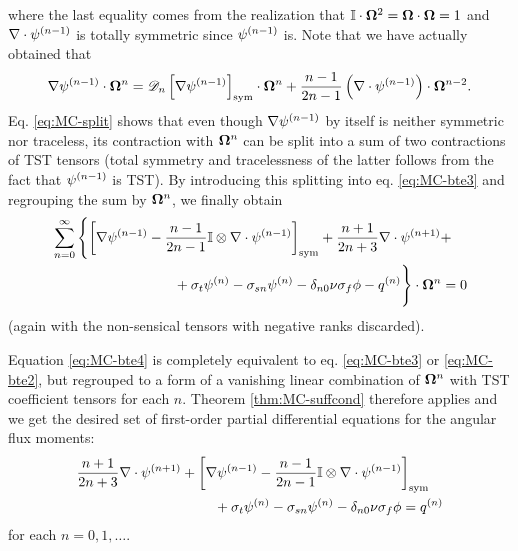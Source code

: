 where the last equality comes from the realization that $\eye\cdot\bomega^2 = \bomega\cdot\bomega = 1$ and 
$\nabla\cdot\fmom[n-1]$ is totally symmetric since $\fmom[n-1]$ is. 
Note that we have actually obtained that
\begin{equation}\label{eq:MC-split}
  \nabla\fmom[n-1]\contr\bomega^n = \detr\Sym{\nabla\fmom[n-1]}\contr\bomega^n + 
  \frac{n-1}{2n-1}\left(\nabla\cdot\fmom[n-1]\right)\contr\bomega^{n-2}.
\end{equation}
Eq. \eqref{eq:MC-split} shows that even though $\nabla\fmom[n-1]$ by itself is neither symmetric nor traceless, its 
contraction with $\bomega^n$ can be split into a sum of two contractions of TST tensors (total symmetry and 
tracelessness of the latter follows from the fact that $\fmom[n-1]$ is TST). By introducing this splitting into eq. 
\eqref{eq:MC-bte3} and regrouping the sum by $\bomega^n$, we finally obtain
\begin{equation}\label{eq:MC-bte4}
\begin{multlined}
  \suma[n]{0}{\infty}\left\{\Sym{\nabla\fmom[n-1] - \frac{n-1}{2n-1}\eye\otimes\nabla\cdot\fmom[n-1]} + \frac{n+1}{2n+3}\nabla\cdot\fmom[n+1]+\right.\\
  \left.\vphantom{\Sym{\nabla\fmom[n-1] - \frac{n-1}{2n-1}\eye\otimes\nabla\cdot\fmom[n-1]} + \frac{n+1}{2n+3}\nabla\cdot\fmom[n+1]}
     + \sigma_t\fmom - \sigma_{sn}\fmom - \kron{n}{0}\nu\sigma_f\phi - \qmom
  \right\}\contr\bomega^n = 0
\end{multlined}
\end{equation}
(again with the non-sensical tensors with negative ranks discarded).

Equation \eqref{eq:MC-bte4} is completely equivalent to eq. \eqref{eq:MC-bte3} or \eqref{eq:MC-bte2}, but regrouped to a
form of a vanishing linear combination of $\bomega^n$ with TST coefficient tensors for each $n$. Theorem
\ref{thm:MC-suffcond} therefore applies and we get the desired set of first-order partial differential equations for the
angular flux moments:
\begin{equation}\label{eq:MC-set}
\begin{multlined}
  \frac{n+1}{2n+3}\nabla\cdot\fmom[n+1] + \Sym{\nabla\fmom[n-1] - \frac{n-1}{2n-1}\eye\otimes\nabla\cdot\fmom[n-1]} \\+ 
  \sigma_t\fmom - \sigma_{sn}\fmom - \kron{n}{0}\nu\sigma_f\phi = \qmom
\end{multlined}
\end{equation}
for each $n = 0,1,\ldots$. 

